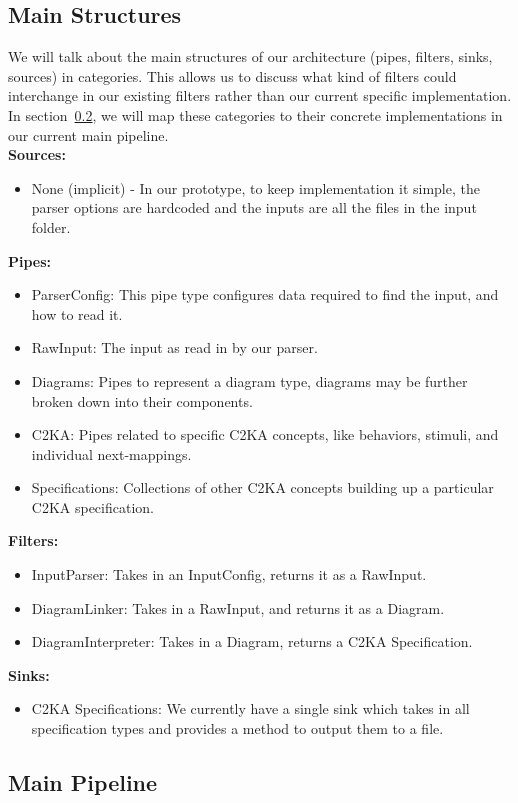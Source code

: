 \documentclass[11pt]{article}
\begin{document}
    \subsection{Main Structures}
    We will talk about the main structures of our architecture (pipes, filters, sinks, sources) in categories.
    This allows us to discuss what kind of filters could interchange in our existing filters
    rather than our current specific implementation.
    In section~\ref{subsec:main-pipeline}, we will map these categories to their concrete implementations in our current main pipeline.\\
    \textbf{Sources:}
    \begin{itemize}
        \item None (implicit) - In our prototype, to keep implementation it simple, the parser options are hardcoded and the inputs are all the files in the input folder.
    \end{itemize}
    \textbf{Pipes:}
    \begin{itemize}
        \item ParserConfig: This pipe type configures data required to find the input, and how to read it.
        \item RawInput: The input as read in by our parser.
        \item Diagrams: Pipes to represent a diagram type, diagrams may be further broken down into their components.
        \item C2KA: Pipes related to specific C2KA concepts, like behaviors, stimuli, and individual next-mappings.
        \item Specifications: Collections of other C2KA concepts building up a particular C2KA specification.
    \end{itemize}
    \textbf{Filters:}
    \begin{itemize}
        \item InputParser: Takes in an InputConfig, returns it as a RawInput.
        \item DiagramLinker: Takes in a RawInput, and returns it as a Diagram.
        \item DiagramInterpreter: Takes in a Diagram, returns a C2KA Specification.
    \end{itemize}
    \textbf{Sinks:}
    \begin{itemize}
        \item C2KA Specifications: We currently have a single sink which takes in all specification types
        and provides a method to output them to a file.
    \end{itemize}

    \subsection{Main Pipeline}\label{subsec:main-pipeline}
\end{document}
